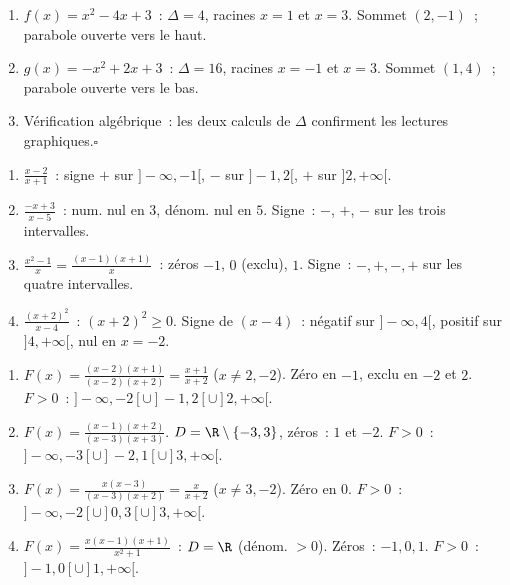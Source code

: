 
\begin{enumerate}
  \item $f(x)=x^2-4x+3$~: $\Delta=4$, racines $x=1$ et $x=3$.
        Sommet $(2,-1)$~; parabole ouverte vers le haut.
  \item $g(x)=-x^2+2x+3$~: $\Delta=16$, racines $x=-1$ et $x=3$.
        Sommet $(1,4)$~; parabole ouverte vers le bas.
  \item V\'erification alg\'ebrique~: les deux calculs de $\Delta$ confirment
        les lectures graphiques.\hfill$\square$
\end{enumerate}


\begin{enumerate}
  \item $\frac{x-2}{x+1}$~: signe $+$ sur $]-\infty,-1[$, $-$ sur $]-1,2[$,
        $+$ sur $]2,+\infty[$.
  \item $\frac{-x+3}{x-5}$~: num. nul en $3$, d\'enom. nul en $5$.
        Signe~: $-$, $+$, $-$ sur les trois intervalles.
  \item $\frac{x^2-1}{x}=\frac{(x-1)(x+1)}{x}$~: z\'eros $-1$, $0$ (exclu), $1$.
        Signe~: $-,+,-,+$ sur les quatre intervalles.
  \item $\frac{(x+2)^2}{x-4}$~: $(x+2)^2\geq0$. Signe de $(x-4)$~:
        n\'egatif sur $]-\infty,4[$, positif sur $]4,+\infty[$, nul en $x=-2$.
\end{enumerate}


\begin{enumerate}
  \item $F(x)=\frac{(x-2)(x+1)}{(x-2)(x+2)}=\frac{x+1}{x+2}$ ($x\ne2,-2$).
        Z\'ero en $-1$, exclu en $-2$ et $2$.
        $F>0$~: $]-\infty,-2[\cup]-1,2[\cup]2,+\infty[$.

  \item $F(x)=\frac{(x-1)(x+2)}{(x-3)(x+3)}$. $D=\R\setminus\{-3,3\}$, z\'eros~: $1$ et $-2$.
        $F>0$~: $]-\infty,-3[\cup]-2,1[\cup]3,+\infty[$.

  \item $F(x)=\frac{x(x-3)}{(x-3)(x+2)}=\frac{x}{x+2}$ ($x\ne3,-2$).
        Z\'ero en $0$.
        $F>0$~: $]-\infty,-2[\cup]0,3[\cup]3,+\infty[$.

  \item $F(x)=\frac{x(x-1)(x+1)}{x^2+1}$~: $D=\R$ (d\'enom. $>0$).
        Z\'eros~: $-1,0,1$. $F>0$~: $]-1,0[\cup]1,+\infty[$.
\end{enumerate}


